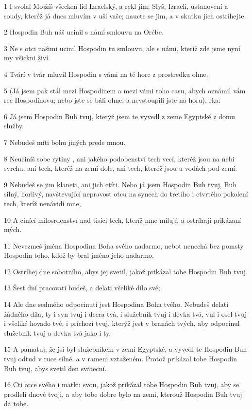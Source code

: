 \par 1 I svolal Mojžíš všecken lid Izraelský, a rekl jim: Slyš, Izraeli, ustanovení a soudy, kteréž já dnes mluvím v uši vaše; naucte se jim, a v skutku jich ostríhejte.
\par 2 Hospodin Buh náš ucinil s námi smlouvu na Orébe.
\par 3 Ne s otci našimi ucinil Hospodin tu smlouvu, ale s námi, kteríž zde jsme nyní my všickni živí.
\par 4 Tvárí v tvár mluvil Hospodin s vámi na té hore z prostredku ohne,
\par 5 (Já jsem pak stál mezi Hospodinem a mezi vámi toho casu, abych oznámil vám rec Hospodinovu; nebo jste se báli ohne, a nevstoupili jste na horu), rka:
\par 6 Já jsem Hospodin Buh tvuj, kterýž jsem te vyvedl z zeme Egyptské z domu služby.
\par 7 Nebudeš míti bohu jiných prede mnou.
\par 8 Neuciníš sobe rytiny , ani jakého podobenství tech vecí, kteréž jsou na nebi svrchu, ani tech, kteréž na zemi dole, ani tech, kteréž jsou u vodách pod zemí.
\par 9 Nebudeš se jim klaneti, ani jich ctíti. Nebo já jsem Hospodin Buh tvuj, Buh silný, horlivý, navštevující nepravost otcu na synech do tretího i ctvrtého pokolení tech, kteríž nenávidí mne,
\par 10 A cinící milosrdenství nad tisíci tech, kteríž mne milují, a ostríhají prikázaní mých.
\par 11 Nevezmeš jména Hospodina Boha svého nadarmo, nebot nenechá bez pomsty Hospodin toho, kdož by bral jméno jeho nadarmo.
\par 12 Ostríhej dne sobotního, abys jej svetil, jakož prikázal tobe Hospodin Buh tvuj.
\par 13 Šest dní pracovati budeš, a delati všeliké dílo své;
\par 14 Ale dne sedmého odpocinutí jest Hospodina Boha tvého. Nebudeš delati žádného díla, ty i syn tvuj i dcera tvá, i služebník tvuj i devka tvá, vul i osel tvuj i všeliké hovado tvé, i príchozí tvuj, kterýž jest v branách tvých, aby odpocinul služebník tvuj a devka tvá jako i ty.
\par 15 A pamatuj, že jsi byl služebníkem v zemi Egyptské, a vyvedl te Hospodin Buh tvuj odtud v ruce silné, a v rameni vztaženém. Protož prikázal tobe Hospodin Buh tvuj, abys svetil den svátecní.
\par 16 Cti otce svého i matku svou, jakož prikázal tobe Hospodin Buh tvuj, aby se prodleli dnové tvoji, a aby tobe dobre bylo na zemi, kterouž Hospodin Buh tvuj dá tobe.
